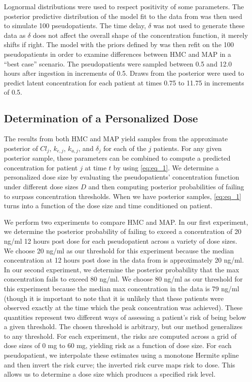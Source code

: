 \noindent Lognormal distributions were used to respect positivity of some parameters.  The posterior predictive distribution of the model fit to the data from \cite{Byon2019-gf} was then used to simulate 100  pseudopatients.  The time delay, $\delta$ was not used to generate these data as $\delta$ does not affect the overall shape of the concentration function, it merely shifts if right.  The model with the priors defined by  was then refit on the 100  pseudopatients in order to examine differences between HMC and MAP in a “best case” scenario. The pseudopatients were sampled between 0.5 and 12.0 hours after ingestion in increments of 0.5. Draws from the posterior were used to predict latent concentration for each patient at times 0.75 to 11.75 in increments of 0.5.

\subsection*{Determination of a Personalized Dose}

The results from both  HMC and MAP yield samples from the approximate posterior of $\mathit{Cl}_{j}$, $k_{e,j}$, $k_{a,j}$, and $\delta_j$ for each of the $j$ patients.  For any given posterior sample, these parameters can be combined to compute a predicted concentration for patient $j$ at time $t$ by using \cref{eq:eq_1}.   We determine a personalized dose size by evaluating the pseudopatients’ concentration function under different dose sizes $D$ and then computing posterior probabilities of failing to surpass concentration thresholds.  When we have posterior samples, \cref{eq:eq_1} turns into a function of the dose size and time conditioned on patient. 


We perform two experiments to compare HMC and MAP.  In our first experiment, we determine the posterior probability of failing to exceed a concentration of 20 ng/ml 12 hours post dose for each pseudopatient across a variety of dose sizes. We choose 20 ng/ml as our threshold for this experiment because the median concentration at 12 hours post dose  in the data from \cite{Beaton2018-el} is approximately 20 ng/ml. In our second experiment, we determine the posterior probability that the max concentration fails to exceed 80 ng/ml.  We choose 80 ng/ml as our threshold for this experiment because the median max concentration in the data is 79 ng/ml (though it is important to note that it is unlikely that these patients were observed exactly at the time which the peak concentration was achieved).  These quantities represent two different ways of assessing a patient's risk of being below a given threshold.  The chosen threshold is arbitrary, but our method generalizes to any threshold.  For each experiment, the risks are computed across a grid of dose sizes of 0 mg to 60 mg, yielding risk as a function of dose size.  For each pseudopatient, we interpolate these estimates using a monotone Hermite spline and then invert the risk curve; the inverted risk curve maps risk to dose. This allows us to determine a dose size which produces a specified risk level.


